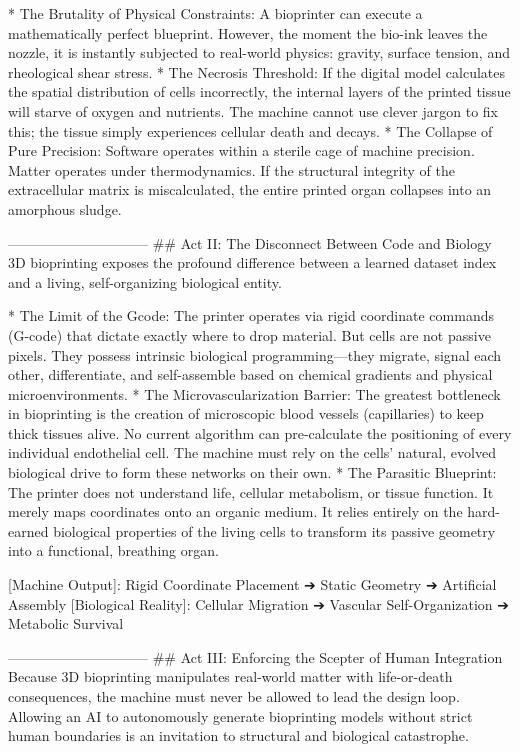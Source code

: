 * The Brutality of Physical Constraints: A bioprinter can execute a mathematically perfect blueprint. However, the moment the bio-ink leaves the nozzle, it is instantly subjected to real-world physics: gravity, surface tension, and rheological shear stress.
* The Necrosis Threshold: If the digital model calculates the spatial distribution of cells incorrectly, the internal layers of the printed tissue will starve of oxygen and nutrients. The machine cannot use clever jargon to fix this; the tissue simply experiences cellular death and decays.
* The Collapse of Pure Precision: Software operates within a sterile cage of machine precision. Matter operates under thermodynamics. If the structural integrity of the extracellular matrix is miscalculated, the entire printed organ collapses into an amorphous sludge.

------------------------------
## Act II: The Disconnect Between Code and Biology
3D bioprinting exposes the profound difference between a learned dataset index and a living, self-organizing biological entity.

* The Limit of the Gcode: The printer operates via rigid coordinate commands (G-code) that dictate exactly where to drop material. But cells are not passive pixels. They possess intrinsic biological programming—they migrate, signal each other, differentiate, and self-assemble based on chemical gradients and physical microenvironments.
* The Microvascularization Barrier: The greatest bottleneck in bioprinting is the creation of microscopic blood vessels (capillaries) to keep thick tissues alive. No current algorithm can pre-calculate the positioning of every individual endothelial cell. The machine must rely on the cells' natural, evolved biological drive to form these networks on their own.
* The Parasitic Blueprint: The printer does not understand life, cellular metabolism, or tissue function. It merely maps coordinates onto an organic medium. It relies entirely on the hard-earned biological properties of the living cells to transform its passive geometry into a functional, breathing organ.

[Machine Output]: Rigid Coordinate Placement ➔ Static Geometry ➔ Artificial Assembly
[Biological Reality]: Cellular Migration ➔ Vascular Self-Organization ➔ Metabolic Survival

------------------------------
## Act III: Enforcing the Scepter of Human Integration
Because 3D bioprinting manipulates real-world matter with life-or-death consequences, the machine must never be allowed to lead the design loop. Allowing an AI to autonomously generate bioprinting models without strict human boundaries is an invitation to structural and biological catastrophe.

